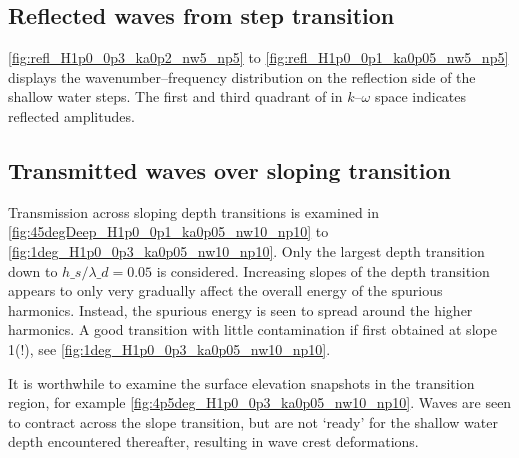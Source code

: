 \subsection{Reflected waves from step transition}

\autoref{fig:refl_H1p0_0p3_ka0p2_nw5_np5} to \ref{fig:refl_H1p0_0p1_ka0p05_nw5_np5} displays the wavenumber--frequency distribution on the reflection side of the shallow water steps. The first and third quadrant of in $k$--$\omega$ space indicates reflected amplitudes. 





\subsection{Transmitted waves over sloping transition}
Transmission across sloping depth transitions is examined in \autoref{fig:45degDeep_H1p0_0p1_ka0p05_nw10_np10} to \ref{fig:1deg_H1p0_0p3_ka0p05_nw10_np10}.
Only the largest depth transition down to $h\_s/\lambda\_d =0.05$ is considered.
Increasing slopes of the depth transition appears to only very gradually affect the overall energy of the spurious harmonics. 
Instead, the spurious energy is seen to spread around the higher harmonics.
A good transition with little contamination if first obtained at slope 1\textdegree{}(!), see \autoref{fig:1deg_H1p0_0p3_ka0p05_nw10_np10}.

It is worthwhile to examine the surface elevation snapshots in the transition region, for example \autoref{fig:4p5deg_H1p0_0p3_ka0p05_nw10_np10}.
Waves are seen to contract across the slope transition, but are not `ready' for the shallow water depth encountered thereafter, resulting in wave crest deformations.
\\


